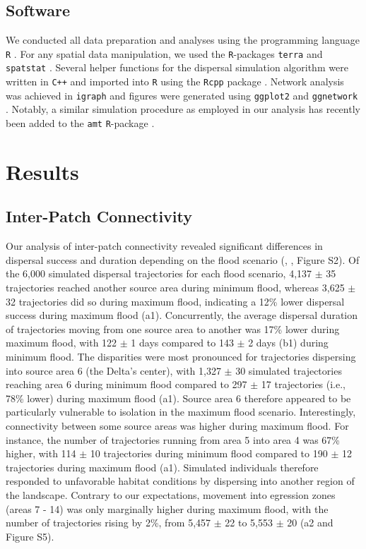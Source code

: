 \documentclass[abstract=on,10pt,a4paper,bibliography=totocnumbered]{article}
\begin{document}
\subsection{Software}

We conducted all data preparation and analyses using the programming language
\texttt{R} \citep{RCoreTeam.2023}. For any spatial data manipulation, we used
the \texttt{R}-packages \texttt{terra} \citep{Hijmans.2023} and
\texttt{spatstat} \citep{Baddeley.2015}. Several helper functions for the
dispersal simulation algorithm were written in \texttt{C++} and imported into
\texttt{R} using the \texttt{Rcpp} package \citep{Eddelbuettel.2011}. Network
analysis was achieved in \texttt{igraph} \citep{Csardi.2006} and figures were
generated using \texttt{ggplot2} \citep{Wickham.2023} and \texttt{ggnetwork}
\citep{Briatte.2023}. Notably, a similar simulation procedure as employed in our
analysis has recently been added to the \texttt{amt} \texttt{R}-package
\citep{Signer.2023}.

\section{Results}
\subsection{Inter-Patch Connectivity}

Our analysis of inter-patch connectivity revealed significant differences in
dispersal success and duration depending on the flood scenario (,
, Figure S2). Of the 6,000 simulated dispersal trajectories for
each flood scenario, 4,137 $\pm$ 35 trajectories reached another source area
during minimum flood, whereas 3,625 $\pm$ 32 trajectories did so during maximum
flood, indicating a 12\% lower dispersal success during maximum flood
(a1). Concurrently, the average dispersal duration of
trajectories moving from one source area to another was 17\% lower during
maximum flood, with 122 $\pm$ 1 days compared to 143 $\pm$ 2 days
(b1) during minimum flood. The disparities were most pronounced
for trajectories dispersing into source area 6 (the Delta's center), with 1,327
$\pm$ 30 simulated trajectories reaching area 6 during minimum flood compared to
297 $\pm$ 17 trajectories (i.e., 78\% lower) during maximum flood
(a1). Source area 6 therefore appeared to be particularly
vulnerable to isolation in the maximum flood scenario. Interestingly,
connectivity between some source areas was higher during maximum flood. For
instance, the number of trajectories running from area 5 into area 4 was 67\%
higher, with 114 $\pm$ 10 trajectories during minimum flood compared to 190
$\pm$ 12 trajectories during maximum flood (a1). Simulated
individuals therefore responded to unfavorable habitat conditions by dispersing
into another region of the landscape. Contrary to our expectations, movement
into egression zones (areas 7 - 14) was only marginally higher during maximum
flood, with the number of trajectories rising by 2\%, from 5,457 $\pm$ 22 to
5,553 $\pm$ 20 (a2 and Figure S5).
\end{document}

